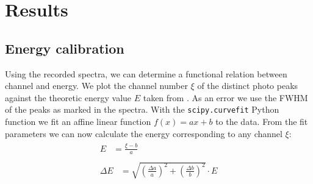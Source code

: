 \section*{Results}
%
\subsection*{Energy calibration}
%
Using the recorded spectra, we can determine a functional relation between channel and energy.
We plot the channel number $\xi$ of the distinct photo peaks against the theoretic energy value $E$ taken from \cite{Anleitung}.
As an error we use the FWHM of the peaks as marked in the spectra.
With the \texttt{scipy.curvefit} Python function we fit an affine linear function $f(x) = ax + b$ to the data.
%
From the fit parameters we can now calculate the energy corresponding to any channel $\xi$:
\begin{align}
    \label{eq:}
    \begin{split}
        E &= \frac{\xi - b}{a}
    \end{split}
    \\
    \label{eq:}
    \begin{split}
        \Delta E &= \sqrt{ \left ( \frac{ \Delta a}{ a } \right ) ^2 + \left ( \frac{\Delta b}{b} \right ) ^2 } \cdot E
    \end{split}
\end{align}
%
